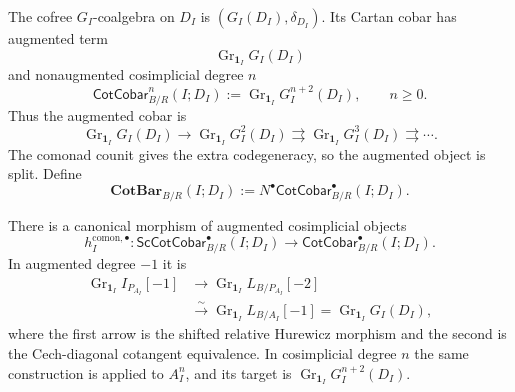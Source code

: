 \begin{definition}
\label{def:as-cotangent-primitive-bar}
The cofree $G_I$-coalgebra on $D_I$ is $(G_I(D_I),\delta_{D_I})$.  Its Cartan
cobar has augmented term
\[
    \operatorname{Gr}_{\mathbf1_I}G_I(D_I)
\]
and nonaugmented cosimplicial degree $n$
\[
\boxed{
    \mathsf{CotCobar}^{n}_{B/R}(I;D_I)
    :=
    \operatorname{Gr}_{\mathbf1_I}G_I^{n+2}(D_I),
    \qquad n\geq0.
}
\]
Thus the augmented cobar is
\[
    \operatorname{Gr}_{\mathbf1_I}G_I(D_I)
    \longrightarrow
    \operatorname{Gr}_{\mathbf1_I}G_I^2(D_I)
    \rightrightarrows
    \operatorname{Gr}_{\mathbf1_I}G_I^3(D_I)
    \rightrightarrows\cdots.
\]
The comonad counit gives the extra codegeneracy, so the augmented object is
split.  Define
\[
\boxed{
    \mathbf{CotBar}_{B/R}(I;D_I)
    :=
    N^\bullet\mathsf{CotCobar}^{\bullet}_{B/R}(I;D_I).
}
\]
\end{definition}

\begin{theorem}
\label{thm:as-relative-operadic-bar-comparison}
There is a canonical morphism of augmented cosimplicial objects
\[
\boxed{
    h_I^{\mathrm{comon},\bullet}:
    \mathsf{ScCotCobar}^{\bullet}_{B/R}(I;D_I)
    \longrightarrow
    \mathsf{CotCobar}^{\bullet}_{B/R}(I;D_I).
}
\]
In augmented degree $-1$ it is
\[
\boxed{
\begin{aligned}
    \operatorname{Gr}_{\mathbf1_I}I_{P_{A_I}}[-1]
    &\longrightarrow
    \operatorname{Gr}_{\mathbf1_I}L_{B/P_{A_I}}[-2]\\
    &\xrightarrow{\sim}
    \operatorname{Gr}_{\mathbf1_I}L_{B/A_I}[-1]
    =
    \operatorname{Gr}_{\mathbf1_I}G_I(D_I),
\end{aligned}}
\]
where the first arrow is the shifted relative Hurewicz morphism and the second
is the Cech-diagonal cotangent equivalence.  In cosimplicial degree $n$ the
same construction is applied to $A_I^n$, and its target is
$\operatorname{Gr}_{\mathbf1_I}G_I^{n+2}(D_I)$.
\end{theorem}

